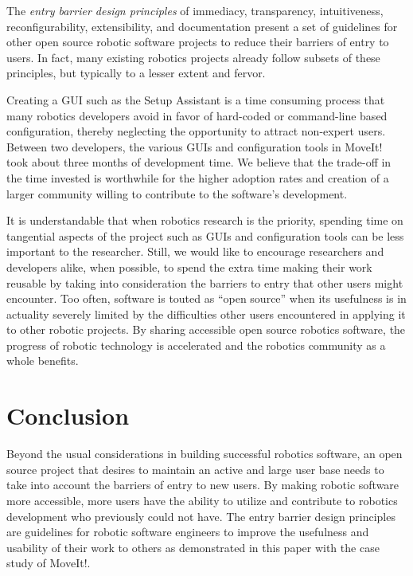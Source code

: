 \documentclass[10pt,journal,compsoc]{joser1}
\begin{document}
{The \textit{entry barrier design principles} of immediacy, transparency, intuitiveness,
reconfigurability, extensibility, and documentation present a set of guidelines
for other open source robotic software projects to reduce their barriers of
entry to users. In fact, many existing robotics projects already follow subsets
of these principles, but typically to a lesser extent and fervor.

Creating a GUI such as the Setup Assistant is a time consuming process that many
robotics developers avoid in favor of hard-coded or command-line based
configuration, thereby neglecting the opportunity to attract non-expert users.
Between two developers, the various GUIs and configuration tools in MoveIt! took
about three months of development time. We believe that the trade-off in the
time invested is worthwhile for the higher adoption rates and creation of a
larger community willing to contribute to the software's development. 

It is understandable that when robotics research is the priority, spending time
on tangential aspects of the project such as GUIs and configuration tools can be
less important to the researcher. Still, we would like to encourage researchers
and developers alike, when possible, to spend the extra time making their work
reusable by taking into consideration the barriers to entry that other users
might encounter. Too often, software is touted as ``open source'' when its
usefulness is in actuality severely limited by the difficulties other users
encountered in applying it to other robotic projects. By sharing accessible open
source robotics software, the progress of robotic technology is accelerated and
the robotics community as a whole benefits.

\section{Conclusion}
\label{sec::conclusion}

Beyond the usual considerations in building successful robotics software, an
open source project that desires to maintain an active and large user base needs
to take into account the barriers of entry to new users. By making robotic
software more accessible, more users have the ability to utilize and contribute
to robotics development who previously could not have. The entry barrier design
principles are guidelines for robotic software engineers to improve the
usefulness and usability of their work to others as demonstrated in this paper
with the case study of MoveIt!.

}
\end{document}
